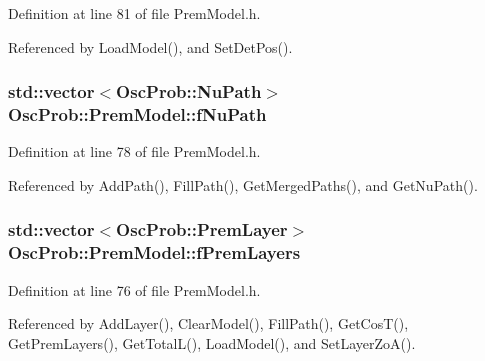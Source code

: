 Definition at line 81 of file Prem\+Model.\+h.



Referenced by Load\+Model(), and Set\+Det\+Pos().

\subsubsection[{\texorpdfstring{f\+Nu\+Path}{fNuPath}}]{\setlength{\rightskip}{0pt plus 5cm}std\+::vector$<${\bf Osc\+Prob\+::\+Nu\+Path}$>$ Osc\+Prob\+::\+Prem\+Model\+::f\+Nu\+Path\hspace{0.3cm}{\ttfamily [protected]}}\hypertarget{classOscProb_1_1PremModel_aaf3c77e35798d664853157013c90ad2b}{}\label{classOscProb_1_1PremModel_aaf3c77e35798d664853157013c90ad2b}


Definition at line 78 of file Prem\+Model.\+h.



Referenced by Add\+Path(), Fill\+Path(), Get\+Merged\+Paths(), and Get\+Nu\+Path().

\subsubsection[{\texorpdfstring{f\+Prem\+Layers}{fPremLayers}}]{\setlength{\rightskip}{0pt plus 5cm}std\+::vector$<${\bf Osc\+Prob\+::\+Prem\+Layer}$>$ Osc\+Prob\+::\+Prem\+Model\+::f\+Prem\+Layers\hspace{0.3cm}{\ttfamily [protected]}}\hypertarget{classOscProb_1_1PremModel_a19a9a3b23ec154ad7a29f92b74aa5bc6}{}\label{classOscProb_1_1PremModel_a19a9a3b23ec154ad7a29f92b74aa5bc6}


Definition at line 76 of file Prem\+Model.\+h.



Referenced by Add\+Layer(), Clear\+Model(), Fill\+Path(), Get\+Cos\+T(), Get\+Prem\+Layers(), Get\+Total\+L(), Load\+Model(), and Set\+Layer\+Zo\+A().

